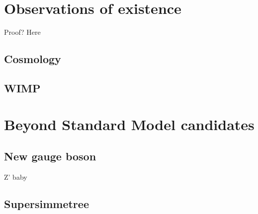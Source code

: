 \documentclass[14pt, a4paper]{book}
\begin{document}
\section{Observations of existence}
Proof? Here \cite{DM1, DM2}
\subsection{Cosmology}
\subsection{WIMP}

\section{Beyond Standard Model candidates}
\subsection{New gauge boson}
Z' baby \cite{Zp_DM_candidate1, Zp_DM_candidate2, Zp_DM_candidate3}
\subsection{Supersimmetree}
\end{document}
